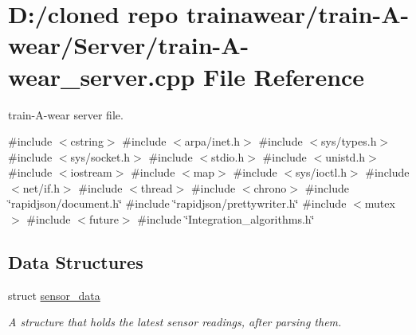\hypertarget{train-_a-wear__server_8cpp}{}\section{D\+:/cloned repo trainawear/train-\/\+A-\/wear/\+Server/train-\/\+A-\/wear\+\_\+server.cpp File Reference}
\label{train-_a-wear__server_8cpp}


train-\/\+A-\/wear server file.  


{\ttfamily \#include $<$cstring$>$}\newline
{\ttfamily \#include $<$arpa/inet.\+h$>$}\newline
{\ttfamily \#include $<$sys/types.\+h$>$}\newline
{\ttfamily \#include $<$sys/socket.\+h$>$}\newline
{\ttfamily \#include $<$stdio.\+h$>$}\newline
{\ttfamily \#include $<$unistd.\+h$>$}\newline
{\ttfamily \#include $<$iostream$>$}\newline
{\ttfamily \#include $<$map$>$}\newline
{\ttfamily \#include $<$sys/ioctl.\+h$>$}\newline
{\ttfamily \#include $<$net/if.\+h$>$}\newline
{\ttfamily \#include $<$thread$>$}\newline
{\ttfamily \#include $<$chrono$>$}\newline
{\ttfamily \#include \char`\"{}rapidjson/document.\+h\char`\"{}}\newline
{\ttfamily \#include \char`\"{}rapidjson/prettywriter.\+h\char`\"{}}\newline
{\ttfamily \#include $<$mutex$>$}\newline
{\ttfamily \#include $<$future$>$}\newline
{\ttfamily \#include \char`\"{}Integration\+\_\+algorithms.\+h\char`\"{}}\newline
\subsection*{Data Structures}
\begin{DoxyCompactItemize}
\item 
struct \mbox{\hyperlink{structsensor__data}{sensor\+\_\+data}}
\begin{DoxyCompactList}\small\item\em A structure that holds the latest sensor readings, after parsing them. \end{DoxyCompactList}\end{DoxyCompactItemize}
